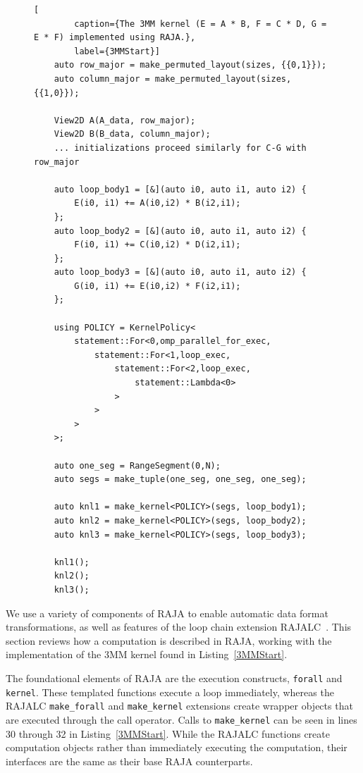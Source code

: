 \documentclass[sigconf,review=true]{acmart}
\begin{document}
\begin{figure}
	\begin{lstlisting}[
		caption={The 3MM kernel (E = A * B, F = C * D, G = E * F) implemented using RAJA.},
		label={3MMStart}]
	auto row_major = make_permuted_layout(sizes, {{0,1}});
	auto column_major = make_permuted_layout(sizes, {{1,0}});

	View2D A(A_data, row_major);
	View2D B(B_data, column_major);
	... initializations proceed similarly for C-G with row_major

	auto loop_body1 = [&](auto i0, auto i1, auto i2) {
		E(i0, i1) += A(i0,i2) * B(i2,i1);
	};
	auto loop_body2 = [&](auto i0, auto i1, auto i2) {
		F(i0, i1) += C(i0,i2) * D(i2,i1);
	};
	auto loop_body3 = [&](auto i0, auto i1, auto i2) {
		G(i0, i1) += E(i0,i2) * F(i2,i1);
	};
	
	using POLICY = KernelPolicy<
		statement::For<0,omp_parallel_for_exec,
			statement::For<1,loop_exec,
				statement::For<2,loop_exec,
					statement::Lambda<0>
				>
			>
		>
	>;

	auto one_seg = RangeSegment(0,N);
	auto segs = make_tuple(one_seg, one_seg, one_seg);

	auto knl1 = make_kernel<POLICY>(segs, loop_body1);
	auto knl2 = make_kernel<POLICY>(segs, loop_body2);
	auto knl3 = make_kernel<POLICY>(segs, loop_body3);

	knl1();
	knl2();
	knl3();
	\end{lstlisting}
\end{figure}

\label{sec:kernelObjects}

We use a variety of components of RAJA to enable automatic data format transformations, as well as features of the loop chain extension RAJALC~\cite{neth2021inter}. 
This section reviews how a computation is described in RAJA, working with the implementation of the 3MM kernel found in Listing~\ref{3MMStart}.

The foundational elements of RAJA are the execution constructs, \verb.forall. and \verb.kernel.. 
These templated functions execute a loop immediately, whereas the RAJALC \verb.make_forall. and \verb.make_kernel. extensions create wrapper objects that are executed through the call operator. 
Calls to \verb.make_kernel. can be seen in lines 30 through 32 in Listing~\ref{3MMStart}. 
While the RAJALC functions create computation objects rather than immediately executing the computation, their interfaces are the same as their base RAJA counterparts.
\end{document}
